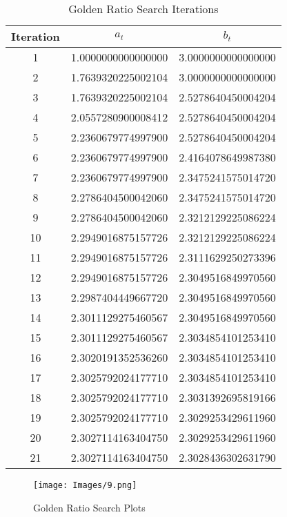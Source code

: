 \documentclass{article}
\begin{document}
\begin{table}
    \centering
    \begin{tabular}{|c|c|c|}
    \hline
    Iteration & $a_t$ & $b_t$ \\
    \hline
    1 & 1.0000000000000000 & 3.0000000000000000 \\
    2 & 1.7639320225002104 & 3.0000000000000000 \\
    3 & 1.7639320225002104 & 2.5278640450004204 \\
    4 & 2.0557280900008412 & 2.5278640450004204 \\
    5 & 2.2360679774997900 & 2.5278640450004204 \\
    6 & 2.2360679774997900 & 2.4164078649987380 \\
    7 & 2.2360679774997900 & 2.3475241575014720 \\
    8 & 2.2786404500042060 & 2.3475241575014720 \\
    9 & 2.2786404500042060 & 2.3212129225086224 \\
    10 & 2.2949016875157726 & 2.3212129225086224 \\
    11 & 2.2949016875157726 & 2.3111629250273396 \\
    12 & 2.2949016875157726 & 2.3049516849970560 \\
    13 & 2.2987404449667720 & 2.3049516849970560 \\
    14 & 2.3011129275460567 & 2.3049516849970560 \\
    15 & 2.3011129275460567 & 2.3034854101253410 \\
    16 & 2.3020191352536260 & 2.3034854101253410 \\
    17 & 2.3025792024177710 & 2.3034854101253410 \\
    18 & 2.3025792024177710 & 2.3031392695819166 \\
    19 & 2.3025792024177710 & 2.3029253429611960 \\
    20 & 2.3027114163404750 & 2.3029253429611960 \\
    21 & 2.3027114163404750 & 2.3028436302631790 \\
    \hline
    \end{tabular}
    \caption{Golden Ratio Search Iterations}
    \label{tab:golden-ratio-search}
\end{table}

\begin{figure}
    \centering
    \texttt{[image: Images/9.png]}
    \caption{Golden Ratio Search Plots}
    \label{fig:golden-ratio-search}
\end{figure}
\end{document}
